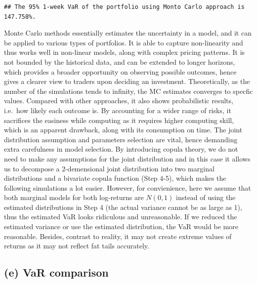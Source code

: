 \documentclass[]{article}
\newenvironment{Shaded}{\begin{snugshade}}{\end{snugshade}}
\newcommand{\DataTypeTok}[1]{\textcolor[rgb]{0.13,0.29,0.53}{#1}}
\newcommand{\FloatTok}[1]{\textcolor[rgb]{0.00,0.00,0.81}{#1}}
\newcommand{\KeywordTok}[1]{\textcolor[rgb]{0.13,0.29,0.53}{\textbf{#1}}}
\newcommand{\NormalTok}[1]{#1}
\newcommand{\StringTok}[1]{\textcolor[rgb]{0.31,0.60,0.02}{#1}}
\begin{document}
\begin{Shaded}
\end{Shaded}

\begin{verbatim}
## The 95% 1-week VaR of the portfolio using Monto Carlo approach is 147.758%.
\end{verbatim}

Monte Carlo methods essentially estimates the uncertainty in a model,
and it can be applied to various types of portfolios. It is able to
capture non-linearity and thus works well in non-linear models, along
with complex pricing patterns. It is not bounded by the historical data,
and can be extended to longer horizons, which provides a broader
opportunity on observing possible outcomes, hence gives a clearer view
to traders upon deciding an investment. Theoretically, as the number of
the simulations tends to infinity, the MC estimates converges to specfic
values. Compared with other approaches, it also shows probabilistic
results, i.e.~how likely each outcome is. By accounting for a wider
range of risks, it sacrifices the easiness while computing as it
requires higher computing skill, which is an apparent drawback, along
with its consumption on time. The joint distribution assumption and
parameters selection are vital, hence demanding extra carefulness in
model selection. By introducing copula theory, we do not need to make
any assumptions for the joint distribution and in this case it allows us
to decompose a 2-demensional joint distribution into two marginal
distributions and a bivariate copula function (Step 4-5), which makes
the following simulations a lot easier. However, for convienience, here
we assume that both marginal models for both log-returns are \(N(0, 1)\)
instead of using the estimated distributions in Step 4 (the actual
variance cannot be as large as 1), thus the estimated VaR looks
ridiculous and unreasonable. If we reduced the estimated variance or use
the estimated distribution, the VaR would be more reasonable. Besides,
contrast to reality, it may not create extreme values of returns as it
may not reflect fat tails accurately.

\hypertarget{e-var-comparison}{%
\subsection{(e) VaR comparison}\label{e-var-comparison}}
\end{document}
